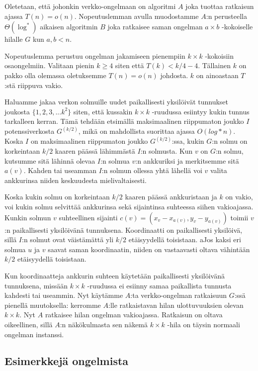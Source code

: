 \documentclass[12pt,finnish]{tktltiki2}
\theoremstyle{definition}
\theoremstyle{remark}
\begin{document}
Oletetaan, että johonkin verkko-ongelmaan on algoritmi $A$ joka tuottaa ratkaisun ajassa $T(n) = o(n)$. Nopeutuslemman avulla muodostamme $A$:n perusteella $\Theta(\log^*)$ aikaisen algoritmin $B$ joka ratkaisee saman ongelman $a \times b$ -kokoiselle hilalle $G$ kun $a, b < n$.

Nopeutuslemma perustuu ongelman jakamiseen pienempiin $k \times k$ -kokoisiin osaongelmiin. Valitaan pienin $k \geq 4$ siten että $T(k) < k/4 - 4$. Tällainen $k$ on pakko olla olemassa oletuksemme $T(n) = o(n)$ johdosta. $k$ on ainoastaan $T$:stä riippuva vakio.

Haluamme jakaa verkon solmuille uudet paikallisesti yksilöivät tunnukset joukosta $\{1, 2, 3, ... k^2\}$ siten, että kussakin $k \times k$ -ruudussa esiintyy kukin tunnus tarkalleen kerran. Tämä tehdään etsimällä maksimaalinen riippumaton joukko $I$ potenssiverkosta $G^{(k/2)}$, mikä on mahdollista suorittaa ajassa $O(log* n)$. Koska $I$ on maksimaalinen riippumaton joukko $G^{(k/2)}$:ssa, kukin $G$:n solmu on korkeintaan $k/2$ kaaren päässä lähimmästä $I$:n solmusta. Kun $v$ on $G$:n solmu, kutsumme sitä lähinnä olevaa $I$:n solmua $v$:n ankkuriksi ja merkitsemme sitä $a(v)$. Kahden tai useamman $I$:n solmun ollessa yhtä lähellä voi $v$ valita ankkurinsa niiden keskuudesta mielivaltaisesti.

Koska kukin solmu on korkeintaan $k/2$ kaaren päässä ankkuristaan ja $k$ on vakio, voi kukin solmu selvittää ankkurinsa sekä sijaintinsa suhteessa siihen vakioajassa. Kunkin solmun $v$ suhteellinen sijainti $c(v) = (x_v - x_{a(v)}, y_v - y_{a(v)})$ toimii $v$:n paikallisesti yksilöivänä tunnuksena. Koordinaatti on paikallisesti yksilöivä, sillä $I$:n solmut ovat väistämättä yli $k/2$ etäisyydellä toisistaan. aJos kaksi eri solmua $u$ ja $v$ saavat saman koordinaatin, niiden on vastaavasti oltava vähintään $k/2$ etäisyydellä toisistaan.

Kun koordinaatteja ankkurin suhteen käytetään paikallisesti yksilöivänä tunnuksena, missään $k \times k$ -ruudussa ei esiinny samaa paikallista tunnusta kahdesti tai useammin. Nyt käytämme $A$:ta verkko-ongelman ratkaisuun $G$:ssä pienellä muutoksella: kerromme $A$:lle ratkaistavan hilan ulottuvuuksien olevan $k \times k$. Nyt $A$ ratkaisee hilan ongelman vakioajassa. Ratkaisun on oltava oikeellinen, sillä $A$:n näkökulmasta sen näkemä $k \times k$ -hila on täysin normaali ongelman instanssi.

\subsection{Esimerkkejä ongelmista}
\end{document}
